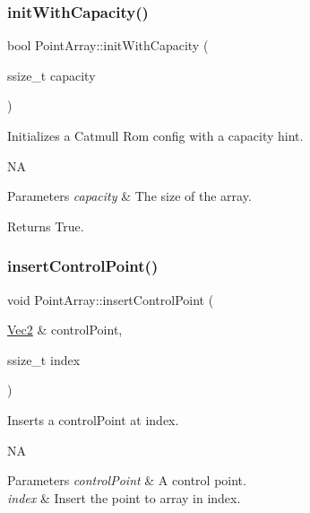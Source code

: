 \subsubsection{\texorpdfstring{init\+With\+Capacity()}{initWithCapacity()}\hspace{0.1cm}{\footnotesize\ttfamily [2/2]}}
{\footnotesize\ttfamily bool Point\+Array\+::init\+With\+Capacity (\begin{DoxyParamCaption}\item[{ssize\+\_\+t}]{capacity }\end{DoxyParamCaption})}

Initializes a Catmull Rom config with a capacity hint.

NA 
\begin{DoxyParams}{Parameters}
{\em capacity} & The size of the array. \\
\hline
\end{DoxyParams}
\begin{DoxyReturn}{Returns}
True. 
\end{DoxyReturn}
\mbox{\label{classPointArray_a4ab1fa2466f44c89383a6121bbcbc077}} 
\subsubsection{\texorpdfstring{insert\+Control\+Point()}{insertControlPoint()}\hspace{0.1cm}{\footnotesize\ttfamily [1/2]}}
{\footnotesize\ttfamily void Point\+Array\+::insert\+Control\+Point (\begin{DoxyParamCaption}\item[{\hyperlink{classVec2}{Vec2} \&}]{control\+Point,  }\item[{ssize\+\_\+t}]{index }\end{DoxyParamCaption})}

Inserts a control\+Point at index.

NA 
\begin{DoxyParams}{Parameters}
{\em control\+Point} & A control point. \\
\hline
{\em index} & Insert the point to array in index. \\
\hline
\end{DoxyParams}
\mbox{\label{classPointArray_ae3f9f4890efb07e4f04d3b1638f1e272}} 
